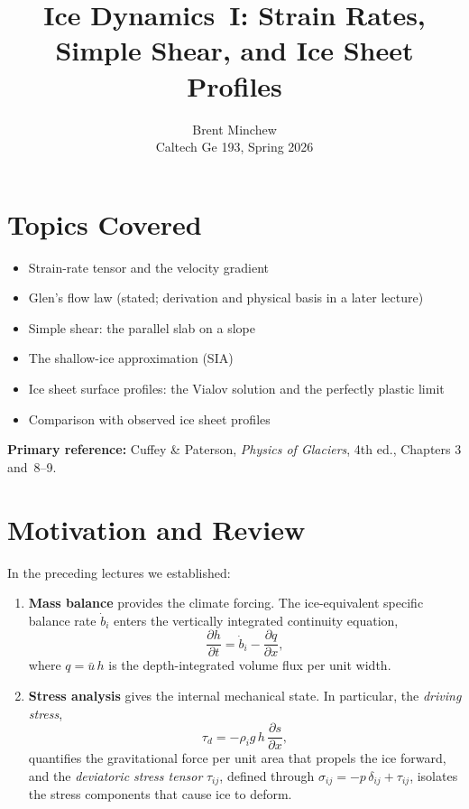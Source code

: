 \documentclass[11pt]{article}
\title{Ice Dynamics~I: Strain Rates, Simple Shear, and Ice Sheet Profiles}
\author{Brent Minchew \\Caltech Ge 193, Spring 2026}
\date{}
\begin{document}
\maketitle

\section*{Topics Covered}

\begin{itemize}
  \item Strain-rate tensor and the velocity gradient
  \item Glen's flow law (stated; derivation and physical basis in a later lecture)
  \item Simple shear: the parallel slab on a slope
  \item The shallow-ice approximation (SIA)
  \item Ice sheet surface profiles: the Vialov solution and the perfectly plastic limit
  \item Comparison with observed ice sheet profiles
\end{itemize}

\noindent\textbf{Primary reference:} Cuffey \& Paterson, \textit{Physics of Glaciers}, 4th ed., Chapters 3 and~8--9.

\section{Motivation and Review}

In the preceding lectures we established:
\begin{enumerate}
  \item \textbf{Mass balance} provides the climate forcing.  The ice-equivalent specific balance rate $\dot{b}_i$ enters the vertically integrated continuity equation,
  \begin{equation}
    \frac{\partial h}{\partial t} = \dot{b}_i - \frac{\partial q}{\partial x},
  \end{equation}
  where $q = \bar{u}\,h$ is the depth-integrated volume flux per unit width.

  \item \textbf{Stress analysis} gives the internal mechanical state.  In particular, the \emph{driving stress},
  \begin{equation}
    \tau_d = -\rho_i g\, h\,\frac{\partial s}{\partial x},
  \end{equation}
  quantifies the gravitational force per unit area that propels the ice forward, and the \emph{deviatoric stress tensor} $\tau_{ij}$, defined through $\sigma_{ij} = -p\,\delta_{ij} + \tau_{ij}$, isolates the stress components that cause ice to deform.
\end{enumerate}
\end{document}
